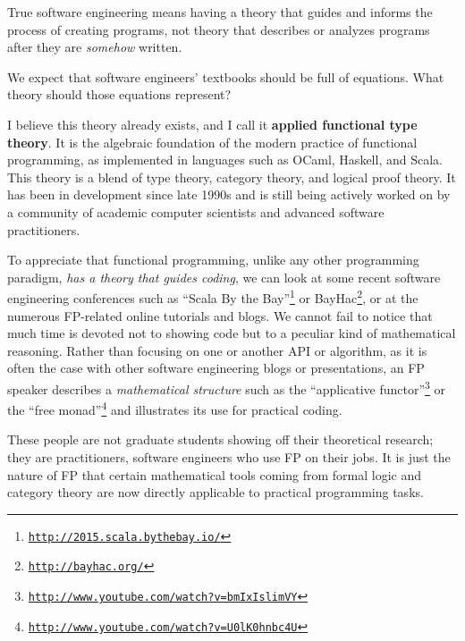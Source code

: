 True software engineering means having a theory that guides and informs
the process of creating programs, \textemdash{} not theory that describes
or analyzes programs after they are \emph{somehow} written.

We expect that software engineers' textbooks should be full of equations.
What theory should those equations represent?

I believe this theory already exists, and I call it \textbf{applied
functional type theory}. It
is the algebraic foundation of the modern practice of functional programming,
as implemented in languages such as OCaml, Haskell, and Scala. This
theory is a blend of type theory, category theory, and logical proof
theory. It has been in development since late 1990s and is still being
actively worked on by a community of academic computer scientists
and advanced software practitioners.

To appreciate that functional programming, unlike any other programming
paradigm, \emph{has a theory that guides coding}, we can look at some
recent software engineering conferences such as ``Scala By the Bay''\footnote{\texttt{\href{http://2015.scala.bythebay.io/}{http://2015.scala.bythebay.io/}}}
or BayHac\footnote{\texttt{\href{http://bayhac.org/}{http://bayhac.org/}}},
or at the numerous FP-related online tutorials and blogs. We cannot
fail to notice that much time is devoted not to showing code but to
a peculiar kind of mathematical reasoning. Rather than focusing on
one or another API or algorithm, as it is often the case with other
software engineering blogs or presentations, an FP speaker describes
a \emph{mathematical structure} \textemdash{} such as the ``applicative
functor''\footnote{\texttt{\href{http://www.youtube.com/watch?v=bmIxIslimVY}{http://www.youtube.com/watch?v=bmIxIslimVY}}}
or the ``free monad''\footnote{\texttt{\href{http://www.youtube.com/watch?v=U0lK0hnbc4U}{http://www.youtube.com/watch?v=U0lK0hnbc4U}}}
\textemdash{} and illustrates its use for practical coding.

These people are not graduate students showing off their theoretical
research; they are practitioners, software engineers who use FP on
their jobs. It is just the nature of FP that certain mathematical
tools \textemdash{} coming from formal logic and category theory \textemdash{}
are now directly applicable to practical programming tasks.

